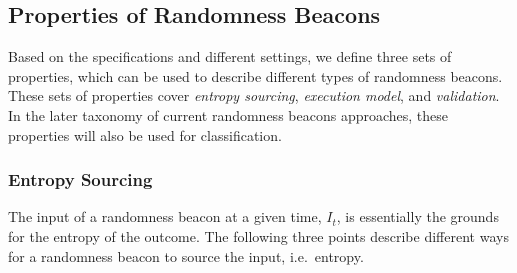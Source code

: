 \subsection{Properties of Randomness Beacons}
Based on the specifications and different settings, we define three sets of properties, which can be used to describe different types of randomness beacons.
These sets of properties cover \emph{entropy sourcing}, \emph{execution model}, and \emph{validation}.
In the later taxonomy of current randomness beacons approaches, these properties will also be used for classification.

\subsubsection{Entropy Sourcing}
The input of a randomness beacon at a given time, $I_t$, is essentially the grounds for the entropy of the outcome.
The following three points describe different ways for a randomness beacon to source the input, i.e.\ entropy.
